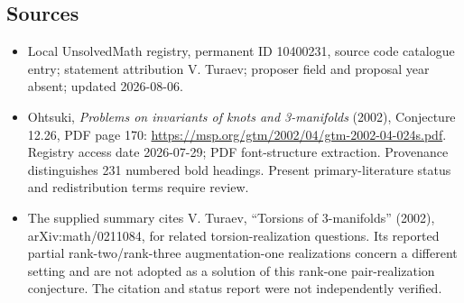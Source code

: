 \documentclass[11pt]{article}
\begin{document}
\subsection{Sources}
\begin{itemize}
\item Local UnsolvedMath registry, permanent ID 10400231, source code catalogue entry; statement attribution V. Turaev; proposer field and proposal year absent; updated 2026-08-06.
\item Ohtsuki, \emph{Problems on invariants of knots and 3-manifolds} (2002), Conjecture 12.26, PDF page 170: \url{https://msp.org/gtm/2002/04/gtm-2002-04-024s.pdf}. Registry access date 2026-07-29; PDF font-structure extraction. Provenance distinguishes 231 numbered bold headings. Present primary-literature status and redistribution terms require review.
\item The supplied summary cites V. Turaev, ``Torsions of 3-manifolds'' (2002), arXiv:math/0211084, for related torsion-realization questions. Its reported partial rank-two/rank-three augmentation-one realizations concern a different setting and are not adopted as a solution of this rank-one pair-realization conjecture. The citation and status report were not independently verified.
\end{itemize}
\end{document}
